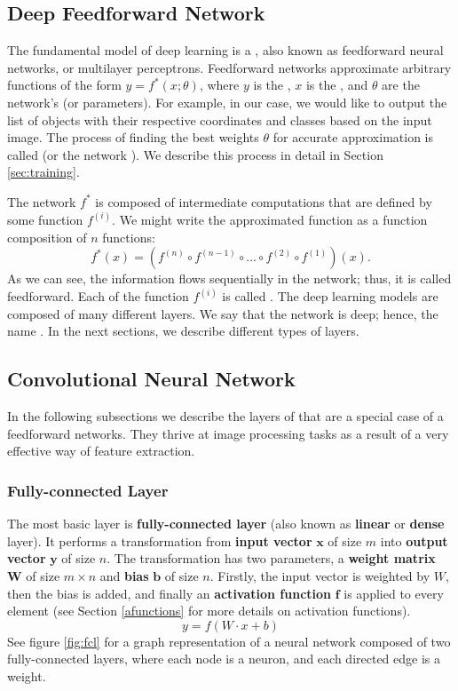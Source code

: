 \subsection{Deep Feedforward Network}
The fundamental model of deep learning is a , also
known as feedforward neural networks, or multilayer perceptrons. Feedforward
networks approximate arbitrary functions of the form $y = f^*(x;\theta)$, where
$y$ is the , $x$ is the , and $\theta$ are the network's
 (or parameters). For example, in our case, we would like to
output the list of objects with their respective coordinates and classes based
on the input image. The process of finding the best weights $\theta$ for
accurate approximation is called  (or the network ).
We describe this process in detail in Section \ref{sec:training}.

The network $f^*$ is composed of intermediate computations that are defined by
some function $f^{(i)}$. We might write the approximated function as a function
composition of $n$ functions:
$$
    f^*(x) = (f^{(n)} \circ f^{(n-1)} \circ ... \circ f^{(2)} \circ f^{(1)})(x).
$$
As we can see, the information flows sequentially in the network; thus, it is
called feedforward. Each of the function $f^{(i)}$ is called . The
deep learning models are composed of many different layers. We say that the
network is deep; hence, the name . In the next sections, we
describe different types of layers.

\subsection{Convolutional Neural Network}
In the following subsections we describe the layers of  that are a special case of a feedforward networks. They thrive at
image processing tasks as a result of a very effective way of feature
extraction.

\subsubsection{Fully-connected Layer}
The most basic layer is \textbf{fully-connected layer} (also known as
\textbf{linear} or \textbf{dense} layer). It performs a transformation from
\textbf{input vector} $\boldsymbol{x}$ of size $m$ into \textbf{output vector}
$\boldsymbol{y}$ of size $n$. The transformation has two parameters, a
\textbf{weight matrix} $\boldsymbol{W}$ of size $m \times n$ and \textbf{bias}
$\boldsymbol{b}$ of size $n$. Firstly, the input vector is weighted by $W$, then
the bias is added, and finally an \textbf{activation function} $\boldsymbol{f}$
is applied to every element (see Section \ref{afunctions} for more details on
activation functions).
$$
    y = f(W\cdot x + b)
$$
See figure \ref{fig:fcl} for a graph representation of a neural network composed
of two fully-connected layers, where each node is a neuron, and each directed
edge is a weight.

